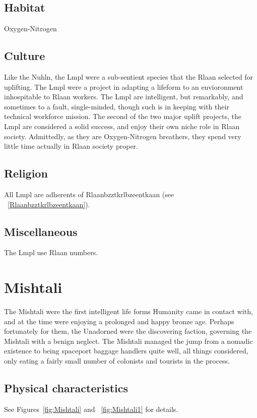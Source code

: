 \subsection{Habitat}
Oxygen-Nitrogen 

\subsection{Culture}
Like the Nuhln, the Lmpl were a sub-sentient species that the Rlaan
selected for uplifting. The Lmpl were a project in adapting a lifeform
to an envioronment inhospitable to Rlaan workers. The Lmpl are
intelligent, but remarkably, and sometimes to a fault, single-minded,
though such is in keeping with their technical workforce mission. The
second of the two major uplift projects, the Lmpl are considered a
solid success, and enjoy their own niche role in Rlaan
society. Admittedly, as they are Oxygen-Nitrogen breathers, they spend
very little time actually in Rlaan society proper.

\subsection{Religion}
All Lmpl are adherents of Rlaanbzztkrlbzeentkaan (see ~\ref{Rlaanbzztkrlbzeentkaan}). 

\subsection{Miscellaneous}
The Lmpl use Rlaan numbers. 

\section{Mishtali}

The Mishtali were the first intelligent life forms Humanity came in
contact with, and at the time were enjoying a prolonged and happy
bronze age. Perhaps fortunately for them, the Unadorned were the
discovering faction, governing the Mishtali with a benign neglect. The
Mishtali managed the jump from a nomadic existence to being spaceport
baggage handlers quite well, all things considered, only eating a
fairly small number of colonists and tourists in the process.

\subsection{Physical characteristics}
See Figures~\ref{fig:Mishtali} and ~\ref{fig:Mishtali1} for details.

